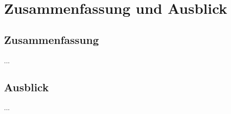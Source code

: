 \chapter{Zusammenfassung und Ausblick}
\label{sec:Zusammenfassung}
\section{Zusammenfassung}
...

\section{Ausblick}
...